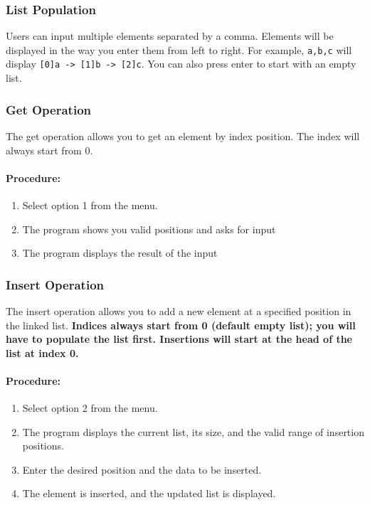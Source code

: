 \documentclass[12pt]{article}
\begin{document}
\subsubsection{List Population}
Users can input multiple elements separated by a comma. Elements will be displayed in the way you enter them from left to right. For example, \texttt{a,b,c} will display \texttt{[0]a -> [1]b -> [2]c}. You can also press enter to start with an empty list.

\newpage
\subsubsection{Get Operation}

The get operation allows you to get an element by index position. The index will always start from 0. 

\paragraph{Procedure:}
\begin{enumerate}
    \item Select option 1 from the menu. 
    \item The program shows you valid positions and asks for input
    \item The program displays the result of the input
\end{enumerate}

\subsubsection{Insert Operation}
The insert operation allows you to add a new element at a specified position in the linked list. \textbf{Indices always start from 0 (default empty list); you will have to populate the list first. Insertions will start at the head of the list at index 0.}

\paragraph{Procedure:}
\begin{enumerate}
    \item Select option 2 from the menu.
    \item The program displays the current list, its size, and the valid range of insertion positions.
    \item Enter the desired position and the data to be inserted.
    \item The element is inserted, and the updated list is displayed.
\end{enumerate}
\end{document}
